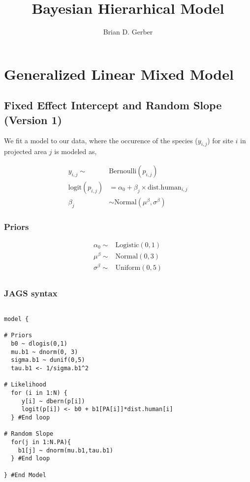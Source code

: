 \documentclass[12pt]{article}
\title{Bayesian Hierarhical Model}
\author{Brian D. Gerber}
\begin{document}
\maketitle
\section{Generalized Linear Mixed Model}
\subsection{Fixed Effect Intercept and Random Slope (Version 1)}

\Large

We fit a model to our data, where the occurence of the species ($y_{i,j}$) for site $i$ in projected area $j$ is modeled as,

\begin{align*}
y_{i,j}\sim& \text{Bernoulli}(p_{i,j})\\
\text{logit}(p_{i,j}) &= \alpha_{0} + \beta_{j}\times \text{dist.human}_{i,j}\\
\beta_{j} &\sim \text{Normal}(\mu^{\beta}, \sigma^{\beta})
\end{align*}

\subsubsection{Priors}

\begin{align*}
\alpha_{0} \sim& \text{Logistic}(0, 1)\\
\mu^{\beta} \sim& \text{Normal}(0, 3)\\
\sigma^{\beta} \sim& \text{Uniform}(0, 5)\\
\end{align*}


\pagebreak

\subsubsection{JAGS syntax}

\begin{verbatim}

model {

# Priors
  b0 ~ dlogis(0,1)
  mu.b1 ~ dnorm(0, 3)
  sigma.b1 ~ dunif(0,5)
  tau.b1 <- 1/sigma.b1^2
  
# Likelihood
  for (i in 1:N) {
     y[i] ~ dbern(p[i])        
     logit(p[i]) <- b0 + b1[PA[i]]*dist.human[i]
  } #End loop
  
# Random Slope
  for(j in 1:N.PA){
    b1[j] ~ dnorm(mu.b1,tau.b1)
  } #End loop
  
} #End Model



\end{verbatim}
\end{document}
